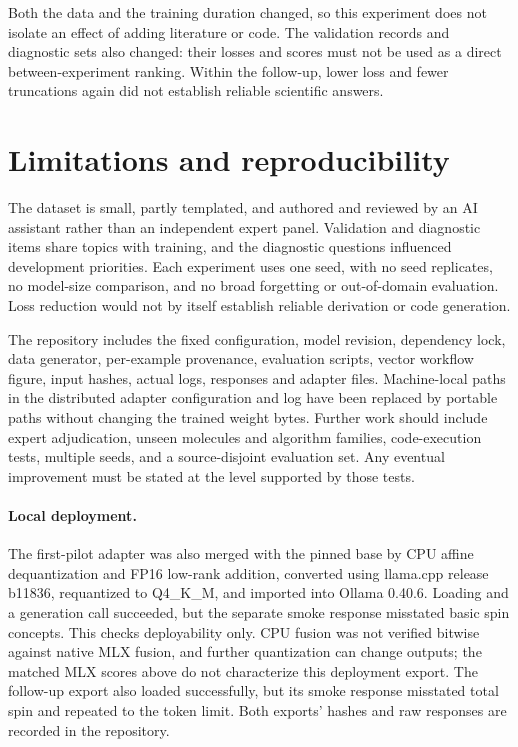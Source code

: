 \documentclass[11pt]{article}
\begin{document}
Both the data and the training duration changed, so this experiment does
not isolate an effect of adding literature or code. The validation records
and diagnostic sets also changed: their losses and scores must not be used
as a direct between-experiment ranking. Within the follow-up, lower loss
and fewer truncations again did not establish reliable scientific answers.

\section{Limitations and reproducibility}
The dataset is small, partly templated, and authored and reviewed by an AI
assistant rather than an independent expert panel. Validation and diagnostic
items share topics with training, and the diagnostic questions influenced
development priorities. Each experiment uses one seed, with no seed replicates,
no model-size comparison,
and no broad forgetting or out-of-domain evaluation. Loss reduction would
not by itself establish reliable derivation or code generation.

The repository includes the fixed configuration, model revision, dependency
lock, data generator, per-example provenance, evaluation scripts, vector
workflow figure, input hashes, actual logs, responses and adapter files.
Machine-local paths in the distributed adapter configuration and log have
been replaced by portable paths without changing the trained weight bytes.
Further work should include expert adjudication,
unseen molecules and algorithm families, code-execution tests, multiple
seeds, and a source-disjoint evaluation set. Any eventual improvement must
be stated at the level supported by those tests.

\paragraph{Local deployment.}
The first-pilot adapter was also merged with the pinned base by CPU affine
dequantization and FP16 low-rank addition, converted using llama.cpp release
b11836, requantized to Q4\_K\_M, and imported into Ollama 0.40.6.
Loading and a generation call succeeded, but the separate smoke response
misstated basic spin concepts. This checks deployability only. CPU fusion
was not verified bitwise against native MLX fusion, and further quantization
can change outputs; the matched MLX scores above do not characterize this
deployment export. The follow-up export also loaded successfully, but its
smoke response misstated total spin and repeated to the token limit.
Both exports' hashes and raw responses are recorded in the repository.
\end{document}

